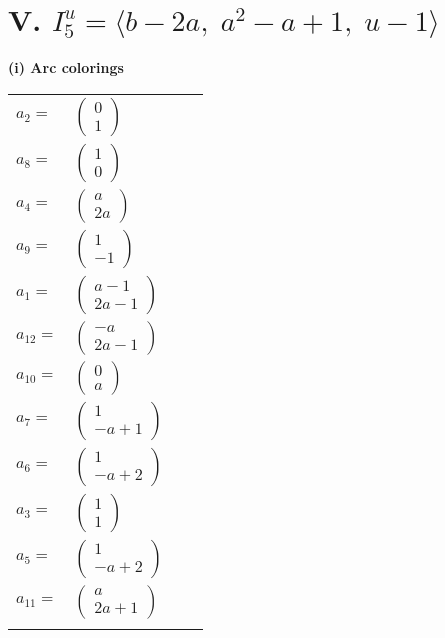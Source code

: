 \documentclass[1p]{elsarticle_modified}
\theoremstyle{definition}
\begin{document}
\centering \section*{V. $I^u_{5}= \langle b-2 a,\;a^2- a+1,\;u-1 \rangle$}
\flushleft \textbf{(i) Arc colorings}\\
\begin{tabular}{m{7pt} m{180pt} m{7pt} m{180pt} }
\flushright $a_{2}=$&$\begin{pmatrix}0\\1\end{pmatrix}$ \\
\flushright $a_{8}=$&$\begin{pmatrix}1\\0\end{pmatrix}$ \\
\flushright $a_{4}=$&$\begin{pmatrix}a\\2 a\end{pmatrix}$ \\
\flushright $a_{9}=$&$\begin{pmatrix}1\\-1\end{pmatrix}$ \\
\flushright $a_{1}=$&$\begin{pmatrix}a-1\\2 a-1\end{pmatrix}$ \\
\flushright $a_{12}=$&$\begin{pmatrix}- a\\2 a-1\end{pmatrix}$ \\
\flushright $a_{10}=$&$\begin{pmatrix}0\\a\end{pmatrix}$ \\
\flushright $a_{7}=$&$\begin{pmatrix}1\\- a+1\end{pmatrix}$ \\
\flushright $a_{6}=$&$\begin{pmatrix}1\\- a+2\end{pmatrix}$ \\
\flushright $a_{3}=$&$\begin{pmatrix}1\\1\end{pmatrix}$ \\
\flushright $a_{5}=$&$\begin{pmatrix}1\\- a+2\end{pmatrix}$ \\
\flushright $a_{11}=$&$\begin{pmatrix}a\\2 a+1\end{pmatrix}$\\&\end{tabular}
\end{document}
